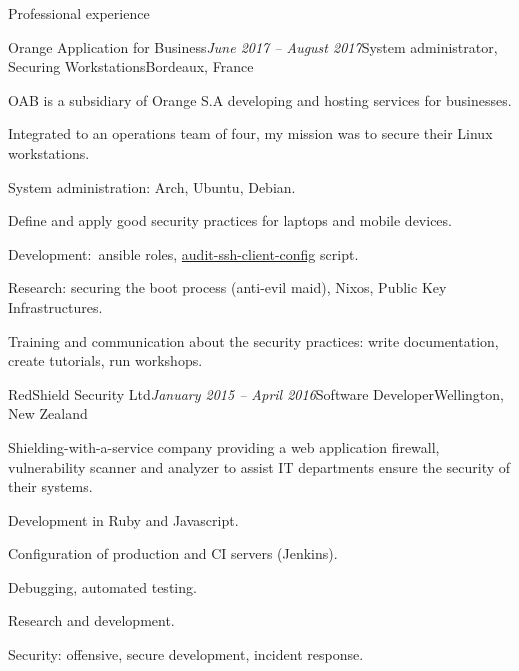 \begin{rSection}{Professional experience}

  \begin{rSubsection}{Orange Application for Business}{\em June 2017 -- August 2017}{System administrator, Securing Workstations}{Bordeaux, France}
    \item[]
      OAB is a subsidiary of Orange S.A developing and hosting services for businesses.
    \item[]
      Integrated to an operations team of four, my mission was to secure their Linux workstations.

    \item System administration: Arch, Ubuntu, Debian.
    \item Define and apply good security practices for laptops and mobile devices.
    \item Development: ansible roles, \href{https://github.com/multimediabs/audit-ssh-client-config}{audit-ssh-client-config} script.
    \item Research: securing the boot process (anti-evil maid), Nixos, Public Key Infrastructures.
    \item Training and communication about the security practices: write documentation, create tutorials, run workshops.
  \end{rSubsection}


  \begin{rSubsection}{RedShield Security Ltd}{\em January 2015 -- April 2016}{Software Developer}{Wellington, New Zealand}
    \item[]
      Shielding-with-a-service company providing a web application firewall, vulnerability scanner and analyzer to assist IT departments ensure the security of their systems.

    \item Development in Ruby and Javascript.
    \item Configuration of production and CI servers (Jenkins).
    \item Debugging, automated testing.
    \item Research and development.
    \item Security: offensive, secure development, incident response.
  \end{rSubsection}


\end{rSection}
